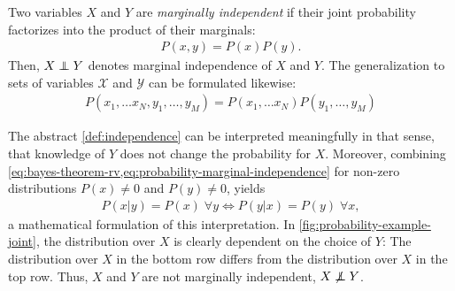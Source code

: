 \begin{mydef}
    \label{def:independence}
    Two variables $X$ and $Y$ are \emph{marginally independent} if their joint probability
    factorizes into the product of their marginals:
    \begin{align}
        \label{eq:probability-marginal-independence}
        P(x,y) = P(x)P(y).
    \end{align}
    Then, $X \independent Y$ denotes marginal independence of $X$ and $Y$. The generalization to
    sets of variables $\mathcal{X}$ and $\mathcal{Y}$ can be formulated likewise:
    \begin{align}
        \label{eq:probability-marginal-independence-sets}
        P(x_1,\hdots x_N, y_1,\hdots, y_M) = P(x_1,\hdots x_N)P(y_1,\hdots, y_M)
    \end{align}
\end{mydef}
The abstract \cref{def:independence} can be interpreted meaningfully in that sense, that knowledge
of $Y$ does not change the probability for $X$. Moreover, combining
\cref{eq:bayes-theorem-rv,eq:probability-marginal-independence} for non-zero distributions $P(x) \ne
0$ and $P(y) \ne 0$, yields
\begin{align}
    \label{eq:probability-marginal-independence-v2}
    P(x|y) = P(x) \;\forall y \Leftrightarrow P(y|x) = P(y) \; \forall x,
\end{align}
a mathematical formulation of this interpretation. In \cref{fig:probability-example-joint}, the
distribution over $X$ is clearly dependent on the choice of $Y$: The distribution over $X$ in the
bottom row differs from the distribution over $X$ in the top row. Thus, $X$ and $Y$ are not marginally
independent, $X \not \independent Y$.

